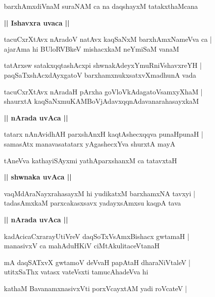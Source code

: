 \documentclass[twoside,12pt,openright]{book}
\newcounter{shloka}[chapter]
\def\uvaca#1{\centerline{{\large\textbf{#1}}}}
\begin{document}
\begin{shloka}%
barxhAmxdiVnaM suraNAM ca na  daqshayxM tatakxthaMcana 
\end{shloka}

\uvaca{|| Ishavxra uvaca ||}

\begin{shloka}%
tacuCxrXtAvx nAradoV natAvx kaqSaNxM barxhAmxNameVva ca |\\
ajarAma hi BUloRVBkeV mishacxkaM neYmiSaM vanaM
\end{shloka}

\begin{shloka}%
tatArxsw satakxqqtashAcxpi shwnakAdeyxYmuRniVshavxreYH |\\
paqSaTxshAcxdAyxgatoV barxhamxnukxsatxvXmadhunA vada
\end{shloka}

\begin{shloka}%
tacuCxrXtAvx nAradaH pArxha goVloVkAdagatoVsamxyXhaM |\\
shaurxtA kaqSaNxmuKAMBoVjAdavxqqnAdavanarahasayxkaM 
\end{shloka}

\uvaca{|| nArada uvAca ||}

\begin{shloka}%
tatarx nAnAvidhAH parxshAnxH kaqtAshecxqqva punaHpunaH |\\
samasAtx manavasatatarx yAgashecxYva shurxtA mayA 
\end{shloka}

\begin{shloka}%
tAneVva kathayiSAyxmi yathAparxshanxM ca tatavxtaH 
\end{shloka}

\uvaca{|| shwnaka uvAca ||}

\begin{shloka}%
vaqMdAraNayxrahasayxM hi yudikatxM barxhamxNA tavxyi |\\
tadasAmxkaM parxcakasxsavx yadayxsAmxsu kaqpA tava
\end{shloka}

\uvaca{|| nArada uvAca ||}

\begin{shloka}%
kadAcicaCxrarayUtiVreV daqSoTxVsAmxBishacx gwtamaH |\\
manasivxV ca mahAduHKiV ciMtAkulitaceVtanaH 
\end{shloka}

\begin{shloka}%
mA daqSATxvX gwtamoV deVvaH papAtaH dharaNiVtaleV |\\
utitxSaThx vatasx vateVsxti tamucAhadeVva hi
\end{shloka}
kathaM BavanamxnasivxVti porxVcayxtAM  yadi roVcateV |\\
\end{document}

